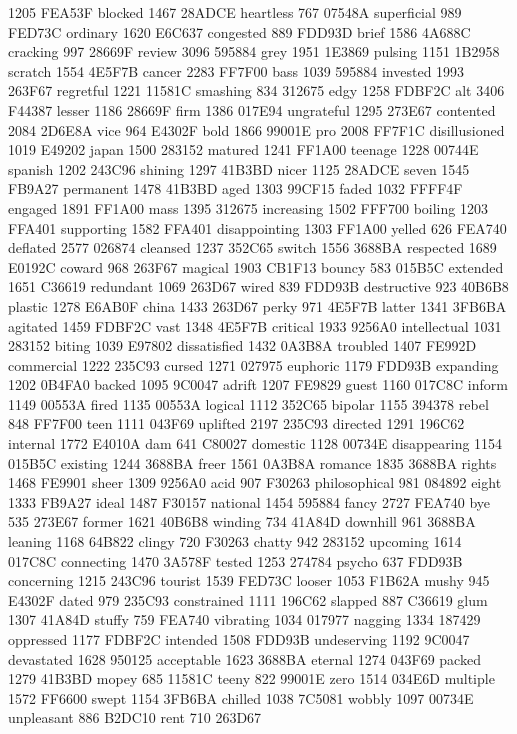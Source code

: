 1205 FEA53F blocked 1467 28ADCE heartless 767 07548A superficial 989
FED73C ordinary 1620 E6C637 congested 889 FDD93D brief 1586 4A688C
cracking 997 28669F review 3096 595884 grey 1951 1E3869 pulsing 1151
1B2958 scratch 1554 4E5F7B cancer 2283 FF7F00 bass 1039 595884 invested
1993 263F67 regretful 1221 11581C smashing 834 312675 edgy 1258 FDBF2C
alt 3406 F44387 lesser 1186 28669F firm 1386 017E94 ungrateful 1295
273E67 contented 2084 2D6E8A vice 964 E4302F bold 1866 99001E pro 2008
FF7F1C disillusioned 1019 E49202 japan 1500 283152 matured 1241 FF1A00
teenage 1228 00744E spanish 1202 243C96 shining 1297 41B3BD nicer 1125
28ADCE seven 1545 FB9A27 permanent 1478 41B3BD aged 1303 99CF15 faded
1032 FFFF4F engaged 1891 FF1A00 mass 1395 312675 increasing 1502 FFF700
boiling 1203 FFA401 supporting 1582 FFA401 disappointing 1303 FF1A00
yelled 626 FEA740 deflated 2577 026874 cleansed 1237 352C65 switch 1556
3688BA respected 1689 E0192C coward 968 263F67 magical 1903 CB1F13
bouncy 583 015B5C extended 1651 C36619 redundant 1069 263D67 wired 839
FDD93B destructive 923 40B6B8 plastic 1278 E6AB0F china 1433 263D67
perky 971 4E5F7B latter 1341 3FB6BA agitated 1459 FDBF2C vast 1348
4E5F7B critical 1933 9256A0 intellectual 1031 283152 biting 1039 E97802
dissatisfied 1432 0A3B8A troubled 1407 FE992D commercial 1222 235C93
cursed 1271 027975 euphoric 1179 FDD93B expanding 1202 0B4FA0 backed
1095 9C0047 adrift 1207 FE9829 guest 1160 017C8C inform 1149 00553A
fired 1135 00553A logical 1112 352C65 bipolar 1155 394378 rebel 848
FF7F00 teen 1111 043F69 uplifted 2197 235C93 directed 1291 196C62
internal 1772 E4010A dam 641 C80027 domestic 1128 00734E disappearing
1154 015B5C existing 1244 3688BA freer 1561 0A3B8A romance 1835 3688BA
rights 1468 FE9901 sheer 1309 9256A0 acid 907 F30263 philosophical 981
084892 eight 1333 FB9A27 ideal 1487 F30157 national 1454 595884 fancy
2727 FEA740 bye 535 273E67 former 1621 40B6B8 winding 734 41A84D
downhill 961 3688BA leaning 1168 64B822 clingy 720 F30263 chatty 942
283152 upcoming 1614 017C8C connecting 1470 3A578F tested 1253 274784
psycho 637 FDD93B concerning 1215 243C96 tourist 1539 FED73C looser
1053 F1B62A mushy 945 E4302F dated 979 235C93 constrained 1111 196C62
slapped 887 C36619 glum 1307 41A84D stuffy 759 FEA740 vibrating 1034
017977 nagging 1334 187429 oppressed 1177 FDBF2C intended 1508 FDD93B
undeserving 1192 9C0047 devastated 1628 950125 acceptable 1623 3688BA
eternal 1274 043F69 packed 1279 41B3BD mopey 685 11581C teeny 822
99001E zero 1514 034E6D multiple 1572 FF6600 swept 1154 3FB6BA chilled
1038 7C5081 wobbly 1097 00734E unpleasant 886 B2DC10 rent 710 263D67
